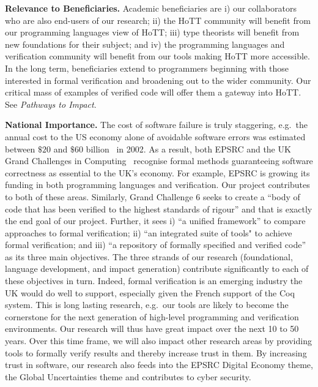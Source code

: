 \documentclass[a4paper,11pt]{article}
\newcommand{\eg}{{e.g.}\ }
\begin{document}
\vspace*{-0.1in}

{\bf Relevance to Beneficiaries.} Academic beneficiaries
are i) our collaborators who are also end-users of our research; ii)
the HoTT community will benefit from our programming languages
view of HoTT; iii) type theorists will benefit from new
foundations for their subject; and iv) the programming languages and
verification community will benefit from our tools making HoTT more
accessible. In the long term, beneficiaries extend to
programmers beginning with those interested in formal
verification and broadening out to the wider community. Our critical
mass of examples of verified code will offer them a gateway
into HoTT. See {\em Pathways to Impact}.
 

{\bf National Importance.} %
The cost of software failure is truly staggering, \eg the annual cost
to the US economy alone of avoidable software errors was estimated
between $\$ 20$ and $\$60$ billion~\cite{grandchallenges} in 2002.  As
a result, both EPSRC and the UK Grand Challenges in
Computing~\cite{grandchallenges} recognise formal methods guaranteeing
software correctness as essential to the UK's economy. For example,
EPSRC is growing its funding in both programming languages and
verification. Our project contributes to both of these
areas. Similarly, Grand Challenge 6 seeks to create a ``body of code
that has been verified to the highest standards of rigour'' and that
is exactly the end goal of our project. Further, it sees i) ``a
unified framework'' to compare approaches to formal verification; ii)
``an integrated suite of tools" to achieve formal verification; and
iii) ``a repository of formally specified and verified code'' as its
three main objectives. The three strands of our research
(foundational, language development, and impact generation) contribute
significantly to each of these objectives in turn.  Indeed, formal
verification is an emerging industry the UK would do well to support,
especially given %
the French support of the Coq system. This is long lasting research,
\eg our tools are likely to become the cornerstone for the next
generation of high-level programming and verification
environments. Our research will thus have great impact over the next
10 to 50 years.  Over this time frame, we will also impact other
research areas by providing tools to formally verify results and
thereby increase trust in them. By increasing trust in software, our
research also feeds into the EPSRC Digital Economy theme, the Global
Uncertainties theme and contributes to cyber security.
\end{document}
